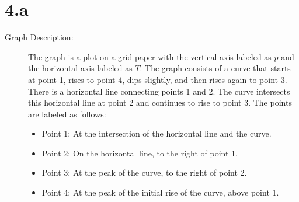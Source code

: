 \section*{4.a}

\begin{description}
    \item[Graph Description:] The graph is a plot on a grid paper with the vertical axis labeled as \( p \) and the horizontal axis labeled as \( T \). The graph consists of a curve that starts at point 1, rises to point 4, dips slightly, and then rises again to point 3. There is a horizontal line connecting points 1 and 2. The curve intersects this horizontal line at point 2 and continues to rise to point 3. The points are labeled as follows:
    \begin{itemize}
        \item Point 1: At the intersection of the horizontal line and the curve.
        \item Point 2: On the horizontal line, to the right of point 1.
        \item Point 3: At the peak of the curve, to the right of point 2.
        \item Point 4: At the peak of the initial rise of the curve, above point 1.
    \end{itemize}
\end{description}